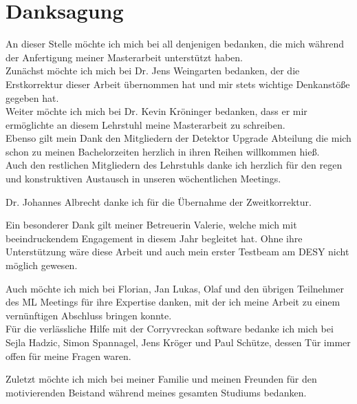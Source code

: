 \thispagestyle{empty}
\section*{Danksagung}

An dieser Stelle möchte ich mich bei all denjenigen bedanken, die mich während
der Anfertigung meiner Masterarbeit unterstützt haben. \\
Zunächst möchte ich mich bei Dr. Jens Weingarten bedanken, der die Erstkorrektur dieser Arbeit übernommen hat und mir stets wichtige Denkanstöße
gegeben hat.\\
Weiter möchte ich mich bei Dr. Kevin Kröninger bedanken, dass er mir ermöglichte an diesem Lehrstuhl meine Masterarbeit zu schreiben. \\
Ebenso gilt mein Dank den Mitgliedern der Detektor Upgrade Abteilung die mich schon zu meinen Bachelorzeiten herzlich in ihren Reihen willkommen hieß. \\
Auch den restlichen Mitgliedern des Lehrstuhls danke ich herzlich für den regen und konstruktiven Austausch in unseren wöchentlichen Meetings.

Dr. Johannes Albrecht danke ich für die Übernahme der Zweitkorrektur.

Ein besonderer Dank gilt meiner Betreuerin Valerie, welche mich mit beeindruckendem Engagement in diesem Jahr begleitet hat. Ohne ihre Unterstützung wäre
diese Arbeit und auch mein erster Testbeam am DESY nicht möglich gewesen.

Auch möchte ich mich bei Florian, Jan Lukas, Olaf und den übrigen Teilnehmer des ML Meetings für ihre Expertise danken, mit der ich meine Arbeit zu einem vernünftigen
Abschluss bringen konnte. \\
Für die verlässliche Hilfe mit der Corryvreckan software bedanke ich mich bei Sejla Hadzic, Simon Spannagel, Jens Kröger und Paul Schütze, dessen Tür immer
offen für meine Fragen waren.

Zuletzt möchte ich mich bei meiner Familie und meinen Freunden für den motivierenden Beistand
während meines gesamten Studiums bedanken.
